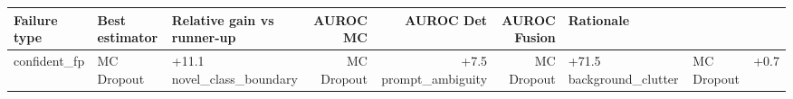\begin{tabular}{lllrrrl}
\toprule
Failure type & Best estimator & Relative gain vs runner-up & AUROC MC & AUROC Det & AUROC Fusion & Rationale \\
\midrule
confident_fp & MC Dropout & +11.1%
novel_class_boundary & MC Dropout & +7.5%
prompt_ambiguity & MC Dropout & +71.5%
background_clutter & MC Dropout & +0.7%
\bottomrule
\end{tabular}
